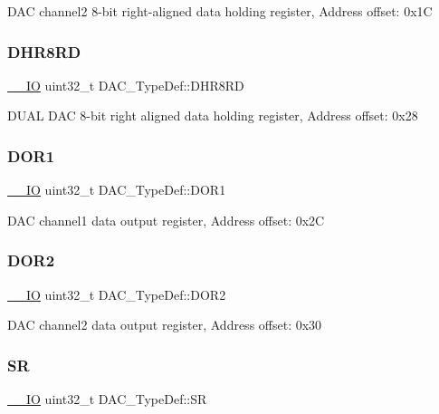 D\+AC channel2 8-\/bit right-\/aligned data holding register, Address offset\+: 0x1C \mbox{\label{struct_d_a_c___type_def_a03f8d95bbf0ce3a53cb79506d5bf995a}} 
\subsubsection{\texorpdfstring{DHR8RD}{DHR8RD}}
{\footnotesize\ttfamily \mbox{\hyperlink{core__sc300_8h_aec43007d9998a0a0e01faede4133d6be}{\+\_\+\+\_\+\+IO}} uint32\+\_\+t D\+A\+C\+\_\+\+Type\+Def\+::\+D\+H\+R8\+RD}

D\+U\+AL D\+AC 8-\/bit right aligned data holding register, Address offset\+: 0x28 \mbox{\label{struct_d_a_c___type_def_a50b4f0b0d2a376f729c8d7acf47864c3}} 
\subsubsection{\texorpdfstring{DOR1}{DOR1}}
{\footnotesize\ttfamily \mbox{\hyperlink{core__sc300_8h_aec43007d9998a0a0e01faede4133d6be}{\+\_\+\+\_\+\+IO}} uint32\+\_\+t D\+A\+C\+\_\+\+Type\+Def\+::\+D\+O\+R1}

D\+AC channel1 data output register, Address offset\+: 0x2C \mbox{\label{struct_d_a_c___type_def_a1bde8391647d6422b39ab5ba4f13848b}} 
\subsubsection{\texorpdfstring{DOR2}{DOR2}}
{\footnotesize\ttfamily \mbox{\hyperlink{core__sc300_8h_aec43007d9998a0a0e01faede4133d6be}{\+\_\+\+\_\+\+IO}} uint32\+\_\+t D\+A\+C\+\_\+\+Type\+Def\+::\+D\+O\+R2}

D\+AC channel2 data output register, Address offset\+: 0x30 \mbox{\label{struct_d_a_c___type_def_a1d3fd83d6ed8b2d90b471db4509b0e70}} 
\subsubsection{\texorpdfstring{SR}{SR}}
{\footnotesize\ttfamily \mbox{\hyperlink{core__sc300_8h_aec43007d9998a0a0e01faede4133d6be}{\+\_\+\+\_\+\+IO}} uint32\+\_\+t D\+A\+C\+\_\+\+Type\+Def\+::\+SR}

